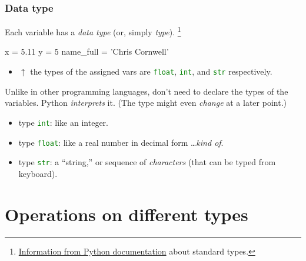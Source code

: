 \documentclass{beamer}
\newenvironment{codeblock}
    {\hfill\begin{beamerboxesrounded}[lower=codecol, width=0.8\textwidth]
    \medskip

    }
    { 
    \end{beamerboxesrounded}\hfill
    }
\theoremstyle{example}
\newcommand{\ct}[1]{\lstinline[language=Python,basicstyle=\ttfamily\footnotesize,stringstyle=\small\color{strings}]!#1!}
\begin{document}
\begin{frame}[fragile]
\frametitle{Data type}

Each variable has a \emph{data type} (or, simply \emph{type}). \footnote{\href{https://docs.python.org/3/library/stdtypes.html}{Information from Python documentation} about standard types.}

\begin{codeblock}

\begin{python}
x = 5.11
y = 5
name_full = 'Chris Cornwell'
\end{python}

\end{codeblock}

\begin{itemize}
	\item[] $\uparrow$ the types of the assigned vars are \ct{float}, \ct{int}, and \ct{str} respectively.
\end{itemize}

\pause
Unlike in other programming languages, don't need to declare the types of the variables. Python \emph{interprets} it. (The type might even \emph{change} at a later point.)

\pause
\vspace*{-8pt}
\begin{itemize}
	\item type \ct{int}: like an integer.
	\item type \ct{float}: like a real number in decimal form \ldots \emph{kind of}.
	\pause
	\item type \ct{str}: a ``string,'' or sequence of \emph{characters} (that can be typed from keyboard). %
\end{itemize}
\end{frame}

\section{Operations on different types}
\end{document}
